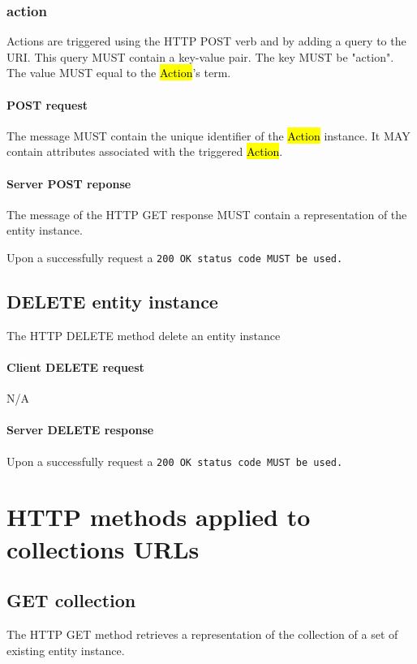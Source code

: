 \documentclass[10pt,a4paper]{article}
\begin{document}
\subsubsection{action}
Actions are triggered using the HTTP POST verb and by adding a query to the URI. This query MUST contain a key-value pair. The key MUST be "action". The value MUST equal to the \hl{Action}'s term.

\paragraph{POST request}
The message MUST contain the unique identifier of the \hl{Action} instance. It MAY contain attributes associated with the triggered \hl{Action}.

\paragraph{Server POST reponse}
The message of the HTTP GET response MUST contain a representation of the entity instance.

Upon a successfully request a \tt{200 OK} status code MUST be used.

\subsection{DELETE entity instance}
The HTTP DELETE method delete an entity instance

\paragraph{Client DELETE request}
N/A

\paragraph{Server DELETE response}
Upon a successfully request a \tt{200 OK} status code MUST be used.

\section{HTTP methods applied to collections URLs}

\subsection{GET collection}
The HTTP GET method retrieves a representation of the collection of a set of existing entity instance.
\end{document}

